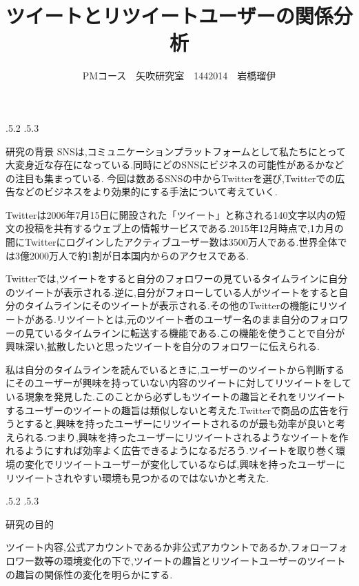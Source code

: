 \documentclass[uplatex]{jsarticle}
\title{\vspace{-14mm}ツイートとリツイートユーザーの関係分析}
\author{PMコース　矢吹研究室　1442014　岩橋瑠伊}
\date{}%
\makeatletter
\renewcommand{\section}{%
    \if@slide\clearpage\fi
    \@startsection{section}{1}{\z@}%
    {\Cvs \@plus.5\Cdp \@minus.2\Cdp}%
    {.5\Cvs \@plus.3\Cdp}%
    {\normalfont\raggedright}}
\makeatother
\begin{document}
\maketitle





\section{研究の背景}
SNSは,コミュニケーションプラットフォームとして私たちにとって大変身近な存在になっている.同時にどのSNSにビジネスの可能性があるかなどの注目も集まっている.
今回は数あるSNSの中からTwitterを選び,Twitterでの広告などのビジネスをより効果的にする手法について考えていく\cite{sns}.

Twitterは2006年7月15日に開設された「ツイート」と称される140文字以内の短文の投稿を共有するウェブ上の情報サービスである.2015年12月時点で,1カ月の間にTwitterにログインしたアクティブユーザー数は3500万人である.世界全体では3億2000万人で約1割が日本国内からのアクセスである\cite{twitter}.

Twitterでは,ツイートをすると自分のフォロワーの見ているタイムラインに自分のツイートが表示される.逆に,自分がフォローしている人がツイートをすると自分のタイムラインにそのツイートが表示される.その他のTwitterの機能にリツイートがある.リツイートとは,元のツイート者のユーザー名のまま自分のフォロワーの見ているタイムラインに転送する機能である.この機能を使うことで自分が興味深い,拡散したいと思ったツイートを自分のフォロワーに伝えられる.

私は自分のタイムラインを読んでいるときに,ユーザーのツイートから判断するにそのユーザーが興味を持っていない内容のツイートに対してリツイートをしている現象を発見した.このことから必ずしもツイートの趣旨とそれをリツイートするユーザーのツイートの趣旨は類似しないと考えた.Twitterで商品の広告を行うとすると,興味を持ったユーザーにリツイートされるのが最も効率が良いと考えられる.つまり,興味を持ったユーザーにリツイートされるようなツイートを作れるようにすれば効率よく広告できるようになるだろう.ツイートを取り巻く環境の変化でリツイートユーザーが変化しているならば,興味を持ったユーザーにリツイートされやすい環境も見つかるのではないかと考えた.

\section{研究の目的}

ツイート内容,公式アカウントであるか非公式アカウントであるか,フォローフォロワー数等の環境変化の下で,ツイートの趣旨とリツイートユーザーのツイートの趣旨の関係性の変化を明らかにする.
\end{document}
